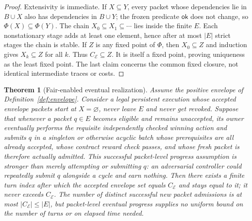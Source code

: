 \documentclass[11pt,letterpaper]{article}
\newtheorem{theorem}{Theorem}[section]
\newcommand{\calE}{\mathcal E}
\begin{document}
\begin{proof}
Extensivity is immediate. If $X\subseteq Y$, every packet whose dependencies lie in $B\cup X$ also has dependencies in $B\cup Y$; the frozen predicate $\mathsf{ok}$ does not change, so $\Phi(X)\subseteq\Phi(Y)$. The chain $X_0\subseteq X_1\subseteq\cdots$ lies inside the finite $E$. Each nonstationary stage adds at least one element, hence after at most $|E|$ strict stages the chain is stable. If $Z$ is any fixed point of $\Phi$, then $X_0\subseteq Z$ and induction gives $X_k\subseteq Z$ for all $k$. Thus $C_{\calE}\subseteq Z$. It is itself a fixed point, proving uniqueness as the least fixed point. The last claim concerns the common fixed closure, not identical intermediate traces or costs.
\end{proof}

\begin{theorem}[Fair-enabled eventual realization]\label{thm:fairclosure}
Assume the positive envelope of Definition~\ref{def:envelope}. Consider a legal persistent execution whose accepted envelope packets start at $X=\varnothing$, never leave $E$ and never get revoked. Suppose that whenever a packet $q\in E$ becomes eligible and remains unaccepted, its owner eventually performs the requisite independently checked winning action and submits $q$ in a \emph{singleton or otherwise acyclic batch} whose prerequisites are all already accepted, whose contract reward check passes, and whose fresh packet is therefore actually admitted. This \emph{successful packet-level progress} assumption is stronger than merely attempting or submitting $q$: an adversarial controller could repeatedly submit $q$ alongside a cycle and earn nothing. Then there exists a finite \emph{turn index} after which the accepted envelope set equals $C_{\calE}$ and stays equal to it; it never exceeds $C_{\calE}$. The number of distinct successful new packet admissions is at most $|C_{\calE}|\leq|E|$, but packet-level eventual progress supplies no uniform bound on the number of turns or on elapsed time needed.
\end{theorem}
\end{document}

